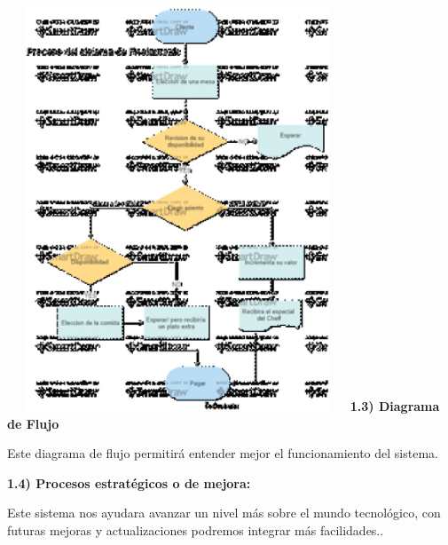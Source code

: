 \documentclass{article} %
\begin{document}
\noindent \includegraphics*[width=3.98in, height=4.74in, keepaspectratio=false]{image3}\textbf{ 1.3) Diagrama de Flujo }

\noindent Este diagrama de flujo permitir\'{a} entender mejor el funcionamiento del sistema. 

\noindent 

\noindent 

\noindent 

\noindent 

\noindent 

\noindent 

\noindent 

\noindent 

\noindent 

\noindent 

\noindent 

\noindent 

\noindent 

\noindent 

\noindent 

\noindent 

\noindent 

\noindent 

\noindent \textbf{  1.4) Procesos estrat\'{e}gicos o de mejora: }

\noindent Este sistema nos ayudara avanzar un nivel m\'{a}s sobre el mundo tecnol\'{o}gico, con futuras mejoras y actualizaciones podremos integrar m\'{a}s facilidades.. 
\end{document}

